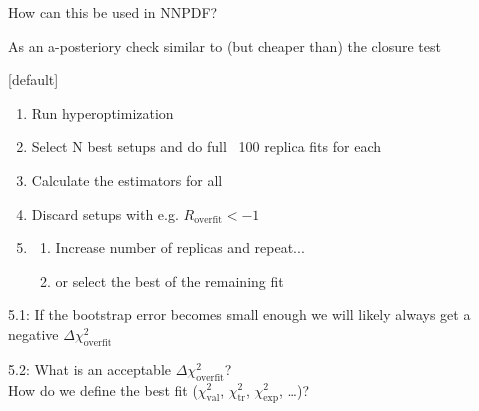 \documentclass[aspectratio=169,11pt]{beamer}
\begin{document}
\begin{frame}[t]{How can this be used in NNPDF?}

  As an a-posteriory check similar to (but cheaper than) the closure test\\\vspace*{1em}

  [default]
  \begin{enumerate}
    \item Run hyperoptimization
    \item Select N best setups and do full ~100 replica fits for each
    \item Calculate the estimators for all
    \item Discard setups with e.g. $R_{\text{overfit}} < -1$
    \item
    \begin{enumerate}
      \item Increase number of replicas and repeat...
      \item or select the best of the remaining fit
    \end{enumerate}
  \end{enumerate}\vspace*{1em}

  5.1: If the bootstrap error becomes small enough we will likely always get a negative $\Delta\chi^2_{\text{overfit}}$

  5.2: What is an acceptable $\Delta\chi^2_{\text{overfit}}$? \\
  \qquad How do we define the best fit ($\chi^2_{\text{val}}$, $\chi^2_{\text{tr}}$, $\chi^2_{\text{exp}}$, \ldots)?\\\vspace*{1em}

\end{frame}



\end{document}
